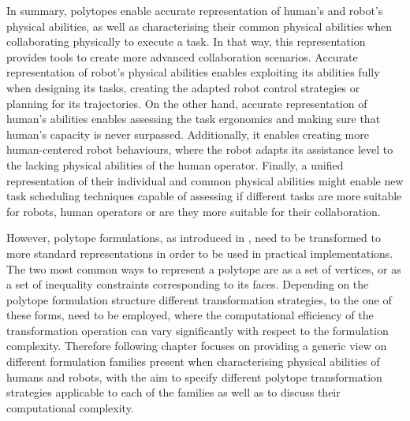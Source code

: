In summary, polytopes enable accurate representation of human's and robot's physical abilities, as well as characterising their common physical abilities when collaborating physically to execute a task. In that way, this representation provides tools to create more advanced collaboration scenarios. 
Accurate representation of robot's physical abilities enables exploiting its abilities fully when designing its tasks, creating the adapted robot control strategies or planning for its trajectories. On the other hand, accurate representation of human's abilities enables assessing the task ergonomics and making sure that human's capacity is never surpassed. Additionally, it enables creating more human-centered robot behaviours, where the robot adapts its assistance level to the lacking physical abilities of the human operator. 
Finally, a unified representation of their individual and common physical abilities might enable new task scheduling techniques capable of assessing if different tasks are more suitable for robots, human operators or are they more suitable for their collaboration. 

However, polytope formulations, as introduced in , need to be transformed to more standard representations in order to  be used in practical implementations. The two most common ways to represent a polytope are as a set of vertices, or as a set of inequality constraints corresponding to its faces. Depending on the polytope formulation structure different transformation strategies, to the one of these forms, need to be employed, where the computational efficiency of the transformation operation can vary significantly with respect to the formulation complexity. Therefore following chapter focuses on providing a generic view on different formulation families present when characterising physical abilities of humans and robots, with the aim to specify different polytope transformation strategies applicable to each of the families as well as to discuss their computational complexity.



